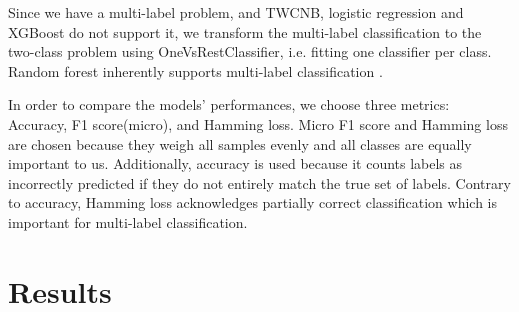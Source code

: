 \documentclass{article}
\begin{document}
\par Since we have a multi-label problem, and TWCNB, logistic regression and XGBoost do not support it, we transform the multi-label classification to the two-class problem using OneVsRestClassifier, i.e. fitting one classifier per class. Random forest inherently supports multi-label classification \cite{breiman2001random}.
\par In order to compare the models’ performances, we choose three metrics: Accuracy, F1 score(micro), and Hamming loss. Micro F1 score and Hamming loss are chosen because they weigh all samples evenly and all classes are equally important to us. Additionally, accuracy is used because it counts labels as incorrectly predicted if they do not entirely match the true set of labels. Contrary to accuracy, Hamming loss acknowledges partially correct classification which is important for multi-label classification.

\section{Results}
\end{document}
